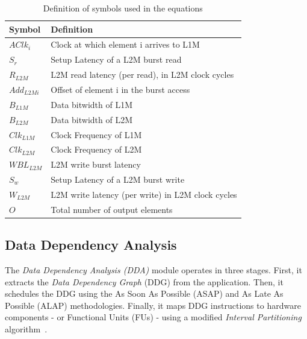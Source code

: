 \begin{table}[]
\centering
\footnotesize
\begin{tabular}{|l|l|}
\hline
\textbf{Symbol} & \textbf{Definition}                                           \\ \hline
$AClk_i$           & Clock at which element i arrives to L1M                \\ 
$S_r$             & Setup Latency of a L2M burst read                          \\ 
$R_{L2M}$       & L2M read latency (per read), in L2M clock cycles   \\ 
$Add_{L2Mi}$     & Offset of element i in the burst access \\ 
$B_{L1M}$        & Data bitwidth of L1M                                       \\ 
$B_{L2M}$        & Data bitwidth of L2M                                       \\ 
$Clk_{L1M}$      & Clock Frequency of L1M                                     \\ 
$Clk_{L2M}$      & Clock Frequency of L2M                                     \\ 
$WBL_{L2M}$      & L2M write burst latency                                    \\ 
$S_w$             & Setup Latency of a L2M burst write                         \\ 
$W_{L2M}$       & L2M write latency (per write) in L2M clock cycles  \\ 
$O$                 & Total number of output elements                            \\ \hline
\end{tabular}
\caption{\small Definition of symbols used in the equations}
\label{table:equation}
\end{table}

\vspace{-1mm}
\subsection{Data Dependency Analysis}
\label{ssec:dda}
\vspace{-1mm}
The \textit{Data Dependency Analysis (DDA)} module operates in three stages. First, it extracts the \textit{Data Dependency Graph} (DDG)\cite{isoda1983global} from the application. Then, it schedules the DDG using the As Soon As Possible (ASAP) and As Late As Possible (ALAP) methodologies. Finally, it maps DDG instructions to hardware components - or Functional Units (FUs) - using a modified \textit{Interval Partitioning} algorithm~\cite{greedyIntervalPartitioning}.

